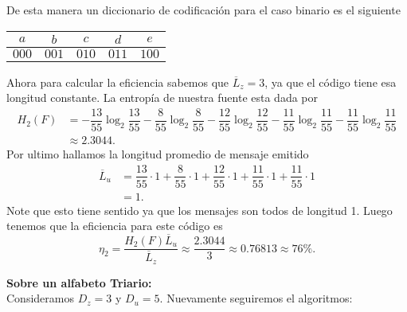 \begin{sols}
\begin{center}
    \end{center}
De esta manera un diccionario de codificación para el caso binario es el siguiente
\begin{center}
  \begin{tabular}{|c|c|c|c|c|}
  \hline
$a$ & $b$ & $c$ & $d$ & $e$\\
\hline
$000$ & $001$ & $010$ & $011$ & $100$\\
\hline
 \end{tabular}
 \end{center}

Ahora para calcular la eficiencia sabemos que $\overline{L}_z=3$, ya que el código tiene esa longitud constante. La entropía de nuestra fuente esta dada por
\begin{align*}
    H_2(F)&=-\dfrac{13}{55}\log_2\dfrac{13}{55}-\dfrac{8}{55}\log_2\dfrac{8}{55}-\dfrac{12}{55}\log_2\dfrac{12}{55}-\dfrac{11}{55}\log_2\dfrac{11}{55}-\dfrac{11}{55}\log_2\dfrac{11}{55}\\
    &\approx2.3044.
\end{align*}
Por ultimo hallamos la longitud promedio de mensaje emitido
\begin{align*}
   \overline{L}_u&=\dfrac{13}{55}\cdot1+\dfrac{8}{55}\cdot1+\dfrac{12}{55}\cdot1+\dfrac{11}{55}\cdot1+\dfrac{11}{55}\cdot1\\
   &=1. 
\end{align*}
Note que esto tiene sentido ya que los mensajes son todos de longitud 1. Luego tenemos que la eficiencia para este código es
$$\eta_2=\dfrac{H_2(F)\overline{L}_u}{\overline{L}_z}\approx\dfrac{2.3044}{3}\approx0.76813\approx 76\%.$$



\textbf{Sobre un alfabeto Triario:}\\

Consideramos $D_z=3$ y $D_u=5.$ Nuevamente seguiremos el algoritmos:


\end{sols}
